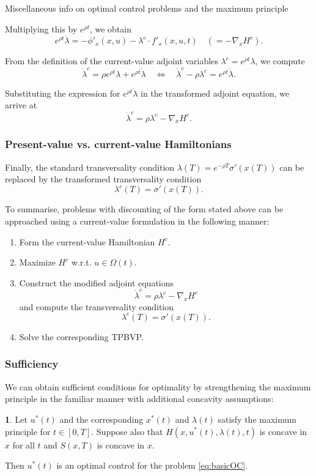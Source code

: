 \documentclass[10pt]{beamer}
\theoremstyle{definition}
\newtheorem{Fact}{\translate{Fact}}
\begin{document}
\begin{section}{Miscellaneous info on optimal control problems and the maximum principle}
\begin{frame}[fragile]
Multiplying this by $ e^{\rho t} $, we obtain \[  e^{\rho t} \dot{\lambda} =-\phi'_x(x,u) - \lambda^c \cdot f'_x(x,u,t) \quad \left(=-\nabla_x H^c\right). \]

From the definition of the current-value adjoint variables $ \lambda^c = e^{\rho t} \lambda $, we compute \[ \dot{\lambda}^c = \rho e^{\rho t} \lambda + e^{\rho t} \dot{\lambda} \quad \Leftrightarrow \quad  \dot{\lambda}^c - \rho \lambda^c = e^{\rho t} \dot{\lambda}. \]

Substituting the expression for $ e^{\rho t} \dot{\lambda} $ in the transformed adjoint equation, we arrive at \[ \dot{\lambda}^c = \rho \lambda^c - \nabla_x H^c . \]
\end{frame}

\begin{frame}[fragile]
\frametitle{Present-value vs. current-value Hamiltonians}
Finally, the standard transversality condition $ \lambda(T) = e^{-\rho T} \sigma'(x(T)) $ can be replaced by the transformed transversality condition 
\[ \lambda^c (T) = \sigma '(x(T)) . \] \bigskip \pause

To summarise, problems with discounting of the form stated above can be approached using a current-value formulation in the following manner:
\begin{enumerate}
\item Form the current-value Hamiltonian $ H^c $.
\item Maximize $ H^c $ w.r.t. $ u\in \Omega(t) $.
\item Construct the modified adjoint equations 
\[ \dot{\lambda}^c = \rho \lambda^c - \nabla_x H^c \] and compute the transversality condition \[ \lambda^c (T) = \sigma '(x(T)) . \]
\item Solve the corresponding TPBVP.
\end{enumerate}
\end{frame}

\begin{frame}[fragile]
\frametitle{Sufficiency}
We can obtain sufficient conditions for optimality by strengthening the maximum principle in the familiar manner with additional concavity assumptions:

\begin{Fact}
Let $ u^*(t) $ and the corresponding $ x^*(t) $ and $ \lambda(t) $ satisfy the maximum principle for $ t\in [0,T] $. Suppose also that $ H(x,u^*(t),\lambda (t),t) $ is concave in $ x $ for all $ t $ and $ S(x,T) $ is concave in $ x $. 

Then $ u^*(t) $ is an optimal control for the problem \eqref{eq:basicOC}.
\label{fc:SCs}
\end{Fact}\bigskip


\end{frame}
\end{section}
\end{document}

